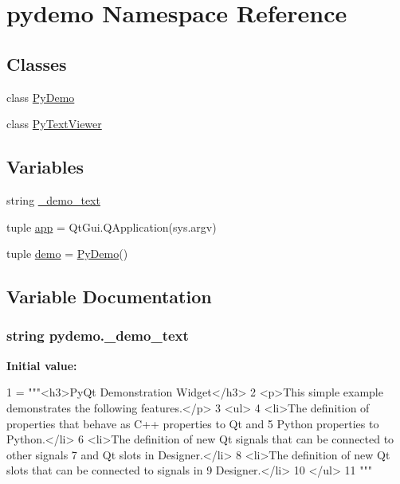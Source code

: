 \hypertarget{namespacepydemo}{}\section{pydemo Namespace Reference}
\label{namespacepydemo}
\subsection*{Classes}
\begin{DoxyCompactItemize}
\item 
class \hyperlink{classpydemo_1_1PyDemo}{Py\+Demo}
\item 
class \hyperlink{classpydemo_1_1PyTextViewer}{Py\+Text\+Viewer}
\end{DoxyCompactItemize}
\subsection*{Variables}
\begin{DoxyCompactItemize}
\item 
string \hyperlink{namespacepydemo_ab21525a30fe2e8bb623233f757d4164f}{\+\_\+demo\+\_\+text}
\item 
tuple \hyperlink{namespacepydemo_a2e570ae54f89f2e5048a4e536f2d9ea6}{app} = Qt\+Gui.\+Q\+Application(sys.\+argv)
\item 
tuple \hyperlink{namespacepydemo_ae1a6de8aa7dc09318d5b94e0297aa9a9}{demo} = \hyperlink{classpydemo_1_1PyDemo}{Py\+Demo}()
\end{DoxyCompactItemize}


\subsection{Variable Documentation}
\hypertarget{namespacepydemo_ab21525a30fe2e8bb623233f757d4164f}{}
\subsubsection[{\+\_\+demo\+\_\+text}]{\setlength{\rightskip}{0pt plus 5cm}string pydemo.\+\_\+demo\+\_\+text}\label{namespacepydemo_ab21525a30fe2e8bb623233f757d4164f}
{\bfseries Initial value\+:}
\begin{DoxyCode}
1 = \textcolor{stringliteral}{"""<h3>PyQt Demonstration Widget</h3>}
2 \textcolor{stringliteral}{<p>This simple example demonstrates the following features.</p>}
3 \textcolor{stringliteral}{<ul>}
4 \textcolor{stringliteral}{ <li>The definition of properties that behave as C++ properties to Qt and}
5 \textcolor{stringliteral}{     Python properties to Python.</li>}
6 \textcolor{stringliteral}{ <li>The definition of new Qt signals that can be connected to other signals}
7 \textcolor{stringliteral}{     and Qt slots in Designer.</li>}
8 \textcolor{stringliteral}{ <li>The definition of new Qt slots that can be connected to signals in}
9 \textcolor{stringliteral}{     Designer.</li>}
10 \textcolor{stringliteral}{</ul>}
11 \textcolor{stringliteral}{"""}
\end{DoxyCode}
\hypertarget{namespacepydemo_a2e570ae54f89f2e5048a4e536f2d9ea6}{}
